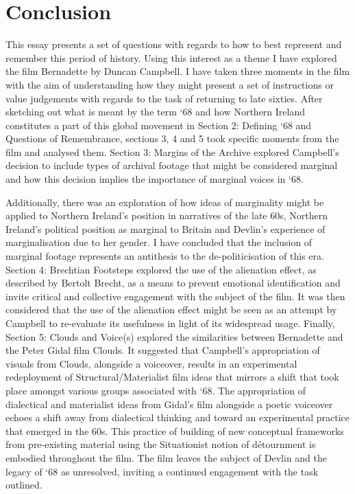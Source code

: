 \documentclass[12pt]{article}
\begin{document}
\section{Conclusion }

This essay presents a set of questions with regards to how to best represent and remember this period of history. Using this interest as a theme I have explored the film Bernadette by Duncan Campbell. I have taken three moments in the film with the aim of understanding how they might present a set of instructions or value judgements with regards to the task of returning to late sixties. After sketching out what is meant by the term `68 and how Northern Ireland constitutes a part of this global movement in Section 2: Defining `68 and Questions of Remembrance, sections 3, 4 and 5 took specific moments from the film and analysed them. Section 3: Margins of the Archive explored Campbell's decision to include types of archival footage that might be considered marginal and how this decision implies the importance of marginal voices in `68. 

Additionally, there was an exploration of how ideas of marginality might be applied to Northern Ireland's position in narratives of the late 60s, Northern Ireland's political position as marginal to Britain and Devlin's experience of marginalisation due to her gender. I have concluded that the inclusion of marginal footage represents an antithesis to the de-politicisation of this era. Section 4: Brechtian Footsteps explored the use of the alienation effect, as described by Bertolt Brecht, as a means to prevent emotional identification and invite critical and collective engagement with the subject of the film. It was then considered that the use of the alienation effect might be seen as an attempt by Campbell to re-evaluate its usefulness in light of its widespread usage. Finally, Section 5: Clouds and Voice(s) explored the similarities between Bernadette and the Peter Gidal film Clouds. It suggested that Campbell's appropriation of visuals from Clouds, alongside a voiceover, results in an experimental redeployment of Structural/Materialist film ideas that mirrors a shift that took place amongst various groups associated with `68. The appropriation of dialectical and materialist ideas from Gidal's film alongside a poetic voiceover echoes a shift away from dialectical thinking and toward an experimental practice that emerged in the 60s. This practice of building of new conceptual frameworks from pre-existing material using the Situationist notion of d\'{e}tournment is embodied throughout the film. The film leaves the subject of Devlin and the legacy of `68 as unresolved, inviting a continued engagement with the task outlined. 
\end{document}
